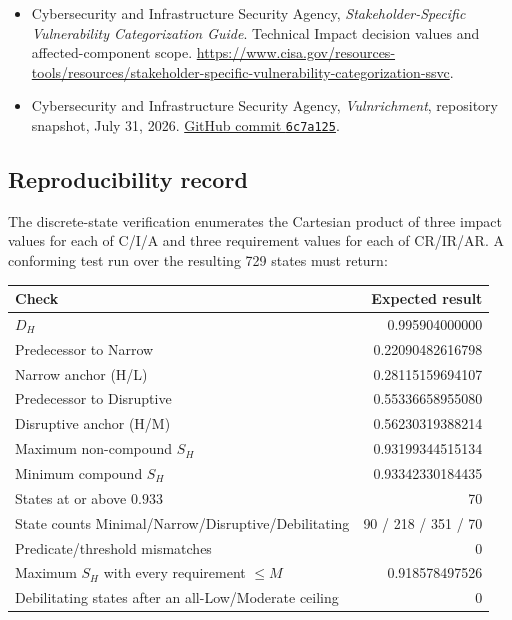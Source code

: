 \documentclass[11pt]{article}
\newcommand{\code}[1]{\texttt{#1}}
\begin{document}
{\begin{itemize}[leftmargin=3.2em,itemsep=0.3em,topsep=0.4em]
  \url{https://cwe.mitre.org/documents/cwe_usage/guidance.html}.
\item[{[CISA-SSVC]}] Cybersecurity and Infrastructure Security Agency,
  \emph{Stakeholder-Specific Vulnerability Categorization Guide}. Technical Impact
  decision values and affected-component scope.
  \url{https://www.cisa.gov/resources-tools/resources/stakeholder-specific-vulnerability-categorization-ssvc}.
\item[{[CISA-VULN]}] Cybersecurity and Infrastructure Security Agency,
  \emph{Vulnrichment}, repository snapshot, July 31, 2026.
  \href{https://github.com/cisagov/vulnrichment/tree/6c7a125e39a2e4dd0eb6fb22dbd68c4f71b0c89b}{GitHub commit \code{6c7a125}}.
\end{itemize}
}

\subsection*{Reproducibility record}

The discrete-state verification enumerates the Cartesian product of three impact
values for each of C/I/A and three requirement values for each of CR/IR/AR. A
conforming test run over the resulting 729 states must return:

\begin{center}
\small
\begin{tabular}{@{}lr@{}}
\toprule
\textbf{Check} & \textbf{Expected result} \\
\midrule
$D_H$ & 0.995904000000 \\
Predecessor to Narrow & 0.22090482616798 \\
Narrow anchor (H/L) & 0.28115159694107 \\
Predecessor to Disruptive & 0.55336658955080 \\
Disruptive anchor (H/M) & 0.56230319388214 \\
Maximum non-compound $S_H$ & 0.93199344515134 \\
Minimum compound $S_H$ & 0.93342330184435 \\
States at or above $0.933$ & 70 \\
State counts Minimal/Narrow/Disruptive/Debilitating & 90 / 218 / 351 / 70 \\
Predicate/threshold mismatches & 0 \\
Maximum $S_H$ with every requirement $\le M$ & 0.918578497526 \\
Debilitating states after an all-Low/Moderate ceiling & 0 \\
\bottomrule
\end{tabular}
\end{center}
\end{document}
